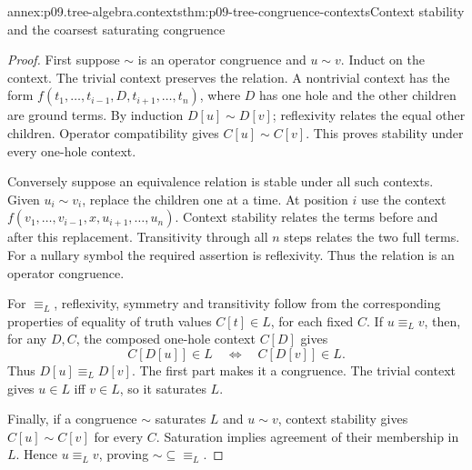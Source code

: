\begin{annexitem}{annex:p09.tree-algebra.contexts}{thm:p09-tree-congruence-contexts}{Context stability and the coarsest saturating congruence}
\begin{proof}
First suppose \(\sim\) is an operator congruence and \(u\sim v\).
Induct on the context. The trivial context preserves the relation.
A nontrivial context has the form
\(f(t_1,\ldots,t_{i-1},D,t_{i+1},\ldots,t_n)\), where
\(D\) has one hole and the other children are ground terms.
By induction \(D[u]\sim D[v]\); reflexivity relates the equal
other children. Operator compatibility gives \(C[u]\sim C[v]\).
This proves stability under every one-hole context.

Conversely suppose an equivalence relation is stable under all such
contexts. Given \(u_i\sim v_i\), replace the children one at a time.
At position \(i\) use the context
\(f(v_1,\ldots,v_{i-1},x,u_{i+1},\ldots,u_n)\).
Context stability relates the terms before and after this replacement.
Transitivity through all \(n\) steps relates the two full terms.
For a nullary symbol the required assertion is reflexivity.
Thus the relation is an operator congruence.

For \(\equiv_L\), reflexivity, symmetry and transitivity follow from
the corresponding properties of equality of truth values
\(C[t]\in L\), for each fixed \(C\). If \(u\equiv_L v\), then,
for any \(D,C\), the composed one-hole context \(C[D]\) gives
\[
 C[D[u]]\in L\quad\Longleftrightarrow\quad C[D[v]]\in L.
\]
Thus \(D[u]\equiv_L D[v]\). The first part makes it a congruence.
The trivial context gives \(u\in L\) iff \(v\in L\), so it
saturates \(L\).

Finally, if a congruence \(\sim\) saturates \(L\) and \(u\sim v\),
context stability gives \(C[u]\sim C[v]\) for every \(C\).
Saturation implies agreement of their membership in \(L\).
Hence \(u\equiv_L v\), proving \(\sim\subseteq\equiv_L\).
\end{proof}
\end{annexitem}

